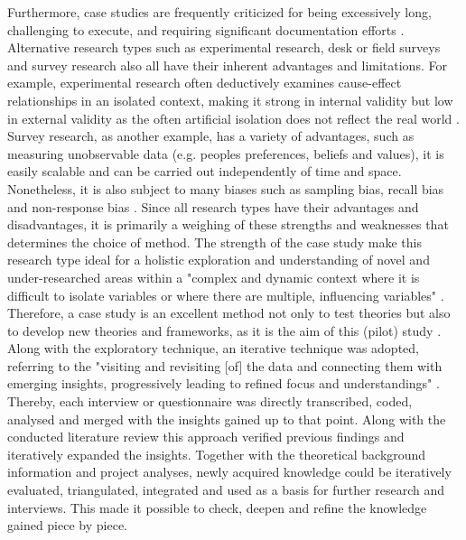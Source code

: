 Furthermore, case studies are frequently criticized for being excessively long, challenging to execute, and requiring significant documentation efforts \autocite{yinCaseStudyResearch1984}. Alternative research types such as experimental research, desk or field surveys and survey research also all have their inherent advantages and limitations. For example, experimental research often deductively examines cause-effect relationships in an isolated context, making it strong in internal validity but low in external validity as the often artificial isolation does not reflect the real world \autocite{pelzResearchMethodsSocial}. Survey research, as another example, has a variety of advantages, such as measuring unobservable data (e.g. peoples preferences, beliefs and values), it is easily scalable and can be carried out independently of time and space. Nonetheless, it is also subject to many biases such as sampling bias, recall bias and non-response bias \autocite{pelzResearchMethodsSocial}.
Since all research types have their advantages and disadvantages, it is primarily a weighing of these strengths and weaknesses that determines the choice of method. The strength of the case study make this research type ideal for a holistic exploration and understanding of novel and under-researched areas within a "complex and dynamic context where it is difficult to isolate variables or where there are multiple, influencing variables" \autocites[2]{fitzgeraldCaseStudiesResearch1999}{zainalCaseStudyResearch2007}. Therefore, a case study is an excellent method not only to test theories but also to develop new theories and frameworks, as it is the aim of this (pilot) study \autocite{pelzResearchMethodsSocial, zainalCaseStudyResearch2007}.\newline
Along with the exploratory technique, an iterative technique was adopted, referring to the "visiting and revisiting [of] the data and connecting them with emerging insights, progressively leading to refined focus and understandings" \autocite[77]{srivastavaPracticalIterativeFramework2009}. Thereby, each interview or questionnaire was directly transcribed, coded, analysed and merged with the insights gained up to that point. Along with the conducted literature review this approach verified previous findings and iteratively expanded the insights. Together with the theoretical background information and project analyses, newly acquired knowledge could be iteratively evaluated, triangulated, integrated and used as a basis for further research and interviews. This made it possible to check, deepen and refine the knowledge gained piece by piece.

